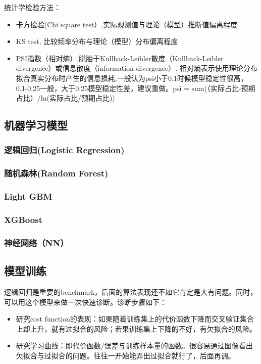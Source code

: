 \documentclass[UTF8,a4paper,12pt, onecolumn]{ctexart}
\begin{document}
统计学检验方法：

\begin{itemize}
  \item 卡方检验(Chi square test）,实际观测值与理论（模型）推断值偏离程度
  \item KS test, 比较频率分布与理论（模型）分布偏离程度
  \item PSI指数（相对熵）,脱胎于Kullback-Leibler散度（Kullback-Leibler divergence）或信息散度（information divergence）. 相对熵表示使用理论分布拟合真实分布时产生的信息损耗,一般认为psi小于0.1时候模型稳定性很高，0.1-0.25一般，大于0.25模型稳定性差，建议重做。psi = sum(（实际占比-预期占比）/ln(实际占比/预期占比))
\end{itemize}

\subsection{机器学习模型}

\subsubsection{逻辑回归(Logistic Regression)}

\subsubsection{随机森林(Random Forest)}

\subsubsection{Light GBM}

\subsubsection{XGBoost}

\subsubsection{神经网络（NN）}

\subsection{模型训练}

逻辑回归是重要的benchmark，后面的算法表现还不如它肯定是大有问题。同时，可以用这个模型来做一次快速诊断。诊断步骤如下：
\begin{itemize}
  \item 研究cost function的表现：如果随着训练集上的代价函数下降而交叉验证集合上却上升，就有过拟合的风险；若果训练集上下降的不好，有欠拟合的风险。
  \item 研究学习曲线：即代价函数/误差与训练样本量的函数。很容易通过图像看出欠拟合与过拟合的问题。往往一开始能弄出过拟合就行了，后面再调。
\end{itemize}
\end{document}
